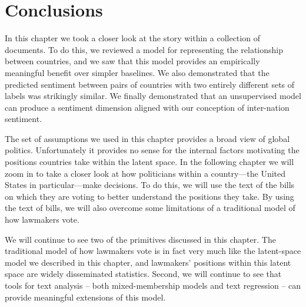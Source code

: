 \section{Conclusions}

In this chapter we took a closer look at the story within a collection
of documents.  To do this, we reviewed a model for representing the
relationship between countries, and we saw that this model provides an
empirically meaningful benefit over simpler baselines.  We also
demonstrated that the predicted sentiment between pairs of countries
with two entirely different sets of labels was strikingly similar.  We
finally demonstrated that an unsupervised model can produce a
sentiment dimension aligned with our conception of inter-nation
sentiment.

The set of assumptions we used in this chapter provides a broad view
of global politics.  Unfortunately it provides no sense for the
internal factors motivating the positions countries take within the
latent space.  In the following chapter we will zoom in to take a
closer look at how politicians within a country---the United States in
particular---make decisions.  To do this, we will use the text of the
bills on which they are voting to better understand the positions they
take.  By using the text of bills, we will also overcome some
limitations of a traditional model of how lawmakers vote.

We will continue to see two of the primitives discussed in this
chapter.  The traditional model of how lawmakers vote is in fact very
much like the latent-space model we described in this chapter, and
lawmakers' positions within this latent space are widely disseminated
statistics. Second, we will continue to see that tools for text
analysis -- both mixed-membership models and text regression -- can
provide meaningful extensions of this model.
